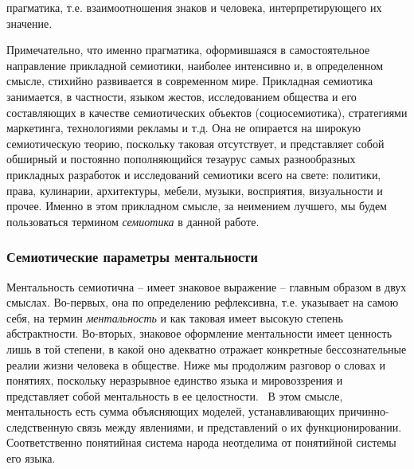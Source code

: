 \begin{enumerate}
\begin{enumerate*}[label=\asbuk*)]
  \item прагматика, т.е. взаимоотношения знаков и человека, интерпретирующего их значение.
  \end{enumerate*}
  Примечательно, что именно прагматика, оформившаяся в самостоятельное направление прикладной
  семиотики, наиболее интенсивно и, в определенном смысле, стихийно развивается в современном мире.
  Прикладная семиотика занимается, в частности, языком жестов, исследованием общества и его
  составляющих в качестве семиотических объектов (социосемиотика), стратегиями маркетинга,
  технологиями рекламы и т.д. Она не опирается на широкую семиотическую теорию, поскольку
  таковая отсутствует, и представляет собой обширный и постоянно пополняющийся тезаурус
  самых разнообразных прикладных разработок и исследований семиотики всего на свете:
  политики, права, кулинарии, архитектуры, мебели, музыки, восприятия, визуальности и прочее.
  Именно в этом прикладном смысле, за неимением лучшего, мы будем пользоваться термином \emph{семиотика}
  в данной работе.
\end{enumerate}

\subsubsection{Семиотические параметры ментальности}\label{1.2}
Ментальность семиотична -- имеет знаковое выражение -- главным образом в двух смыслах.
Во-первых, она по определению рефлексивна, т.е. указывает на самою себя, на термин \emph{ментальность} и
как таковая имеет высокую степень абстрактности. Во-вторых, знаковое оформление ментальности
имеет ценность лишь в той степени, в какой оно адекватно отражает конкретные бессознательные
реалии жизни человека в обществе. Ниже мы продолжим разговор о словах и понятиях, поскольку
неразрывное единство языка и мировоззрения и представляет собой ментальность в ее целостности.~\autocite{lurie}
В этом смысле, ментальность есть сумма объясняющих моделей, устанавливающих причинно-следственную
связь между явлениями, и представлений о их функционировании. Соответственно понятийная система
народа неотделима от понятийной системы его языка.

